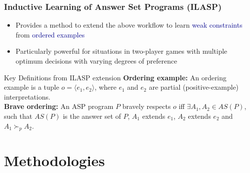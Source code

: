 \documentclass{beamer}
\newcommand\re[1]{\textcolor{darkblue}{#1}}
\begin{document}
\begin{framefont}{\footnotesize}
  \begin{frame}
    \frametitle{Inductive Learning of Answer Set Programs (ILASP)}
    \begin{itemize}[<+->]
      \item Provides a method to extend the above workflow to learn \re{weak constraints} from \re{ordered examples}
      \item Particularly powerful for situations in two-player games with multiple optimum decisions with varying degrees of preference
    \end{itemize}
    \pause
    \begin{block}{Key Definitions from ILASP extension}
    \textbf{Ordering example:} An ordering example is a tuple $o = \langle e_1,e_2 \rangle$, where $e_1$ and $e_2$ are partial (positive-example) interpretations. \\[5pt]
    \textbf{Brave ordering:} An ASP program $P$ bravely respects $o$ iff $\exists A_1,A_2 \in AS(P)$, such that $AS(P)$ is the answer set of $P$, $A_1$ extends $e_1$, $A_2$ extends $e_2$ and $A_1 \succ_p A_2$.
    \end{block}
  \end{frame}
\end{framefont}

\section{Methodologies}
\end{document}
